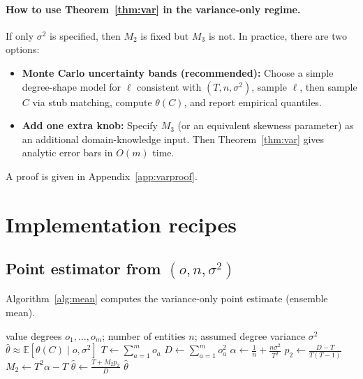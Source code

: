 \documentclass[11pt]{article}
\newcommand{\E}{\mathbb{E}}
\newcommand{\1}{\mathbf{1}}
\newcommand{\coll}{\mathcal{C}} %
\theoremstyle{plain}
\theoremstyle{definition}
\begin{document}
\paragraph{How to use Theorem~\ref{thm:var} in the variance-only regime.}
If only $\sigma^2$ is specified, then $M_2$ is fixed but $M_3$ is not.
In practice, there are two options:
\begin{itemize}[leftmargin=*]
\item \textbf{Monte Carlo uncertainty bands (recommended):} Choose a simple degree-shape model for $\ell$ consistent with $(T,n,\sigma^2)$, sample $\ell$, then sample $C$ via stub matching, compute $\theta(C)$, and report empirical quantiles.
\item \textbf{Add one extra knob:} Specify $M_3$ (or an equivalent skewness parameter) as an additional domain-knowledge input. Then Theorem~\ref{thm:var} gives analytic error bars in $O(m)$ time.
\end{itemize}
A proof is given in Appendix~\ref{app:varproof}.

\section{Implementation recipes}

\subsection{Point estimator from \texorpdfstring{$(o,n,\sigma^2)$}{(o, n, sigma-squared)}}
Algorithm~\ref{alg:mean} computes the variance-only point estimate (ensemble mean).

\begin{algorithm}[htbp]
\caption{Variance-only point estimate of $P(S\mid \coll)$ (ensemble mean)}
\label{alg:mean}
\begin{algorithmic}[1]
\Require value degrees $o_1,\dots,o_m$; number of entities $n$; assumed degree variance $\sigma^2$
\Ensure $\widehat{\theta} \approx \E[\theta(C)\mid o,\sigma^2]$
\State $T \gets \sum_{a=1}^m o_a$
\State $D \gets \sum_{a=1}^m o_a^2$
\State $\alpha \gets \frac{1}{n} + \frac{n\sigma^2}{T^2}$
\State $p_2 \gets \frac{D-T}{T(T-1)}$ 
\State $M_2 \gets T^2\alpha - T$
\State $\widehat{\theta} \gets \frac{T + M_2 p_2}{D}$
\State \Return $\widehat{\theta}$
\end{algorithmic}
\end{algorithm}
\end{document}
